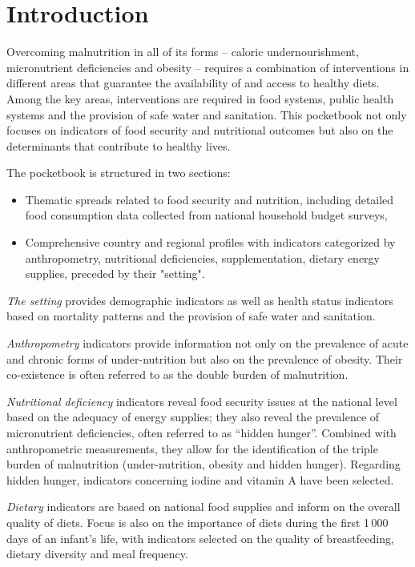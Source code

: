 \section{Introduction}

\bigskip
\bigskip



Overcoming malnutrition in all of its forms – caloric undernourishment, micronutrient deficiencies and obesity – requires a combination of interventions in different areas that guarantee the availability of and access to healthy diets. Among the key areas, interventions are required in food systems, public health systems and the provision of safe water and sanitation. This pocketbook not only focuses on indicators of food security and nutritional outcomes but also on the determinants that contribute to healthy lives. 

The pocketbook is structured in two sections: 
\begin{itemize}
\item Thematic spreads related to food security and nutrition, including detailed food consumption data collected from national household budget surveys,
\item Comprehensive country and regional profiles with indicators categorized by anthropometry, nutritional deficiencies, supplementation, dietary energy supplies, preceded by their "setting".
\end{itemize}

\textit{The setting} provides demographic indicators as well as health status indicators based on mortality patterns and the provision of safe water and sanitation. 

\textit{Anthropometry} indicators provide information not only on the prevalence of acute and chronic forms of under-nutrition but also on the prevalence of obesity. Their co-existence is often referred to as the double burden of malnutrition. 

\textit{Nutritional deficiency} indicators reveal food security issues at the national level based on the adequacy of energy supplies; they also reveal the prevalence of micronutrient deficiencies, often referred to as “hidden hunger”. Combined with anthropometric measurements, they allow for the identification of the triple burden of malnutrition (under-nutrition, obesity and hidden hunger). Regarding hidden hunger, indicators concerning iodine and vitamin A have been selected.

\textit{Dietary} indicators are based on national food supplies and inform on the overall quality of diets. Focus is also on the importance of diets during the first 1\,000 days of an infant’s life, with indicators selected on the quality of breastfeeding, dietary diversity and meal frequency. 

